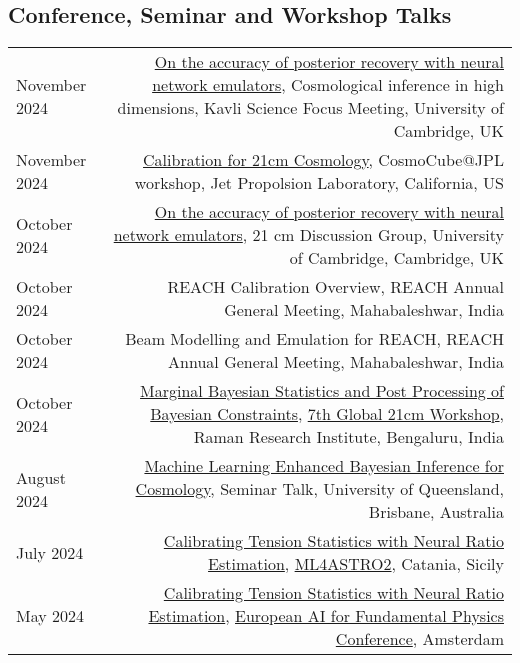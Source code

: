 \documentclass{article}
\begin{document}
\subsection*{Conference, Seminar and Workshop Talks}
\begin{tabular}{L!{\vrule}R}
    November 2024 & \href{https://github.com/htjb/Talks/raw/master/Talks/Kavli-high-dimensional-analysis-20NOV24/posterior-validation.pdf}{On the accuracy of posterior recovery with neural network emulators}, Cosmological inference in high dimensions, Kavli Science Focus Meeting, University of Cambridge, UK \\
    November 2024 & \href{https://github.com/htjb/Talks/raw/master/Talks/CosmoCube-JPL-Workshop-2024/calibration-jpl-cosmocube.pdf}{Calibration for 21cm Cosmology}, CosmoCube@JPL workshop, Jet Propolsion Laboratory, California, US \\
    October 2024 & \href{https://github.com/htjb/Talks/raw/master/Talks/21cm-Meeting-14OCT24/posterior-validation.pdf}{On the accuracy of posterior recovery with neural network emulators}, 21 cm Discussion Group, University of Cambridge, Cambridge, UK \\
    October 2024 & REACH Calibration Overview, REACH Annual General Meeting, Mahabaleshwar, India \\
    October 2024 & Beam Modelling and Emulation for REACH, REACH Annual General Meeting, Mahabaleshwar, India \\
    October 2024 & \href{https://github.com/htjb/Talks/raw/master/Talks/7th-Global-Workshop/margarine.pdf}{Marginal Bayesian Statistics and Post Processing of Bayesian Constraints}, \href{https://sites.google.com/view/global-21-cm-workshop}{7th Global 21cm Workshop}, Raman Research Institute, Bengaluru, India \\
    August 2024 & \href{https://github.com/htjb/Talks/tree/master/Talks/brisbane_davis_group_meeting_2024}{Machine Learning Enhanced Bayesian Inference for Cosmology}, Seminar Talk, University of Queensland, Brisbane, Australia \\
    July 2024 & \href{https://github.com/htjb/Talks/raw/master/Talks/ML4ASTRO-Tensionnets/tensions.pdf}{Calibrating Tension Statistics with Neural Ratio Estimation}, \href{https://indico.ict.inaf.it/event/2690/}{ML4ASTRO2}, Catania, Sicily \\
    May 2024 & \href{https://github.com/htjb/Talks/raw/master/Talks/Amsterdam-EuCAIF-2024/tensions.pdf}{Calibrating Tension Statistics with Neural Ratio Estimation}, \href{https://indico.nikhef.nl/event/4875/}{European AI for Fundamental Physics Conference}, Amsterdam \\

\end{tabular}
\end{document}
